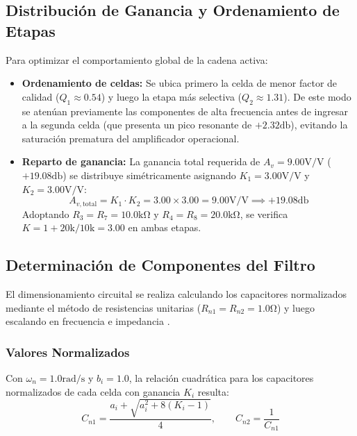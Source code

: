 \subsection{Distribución de Ganancia y Ordenamiento de Etapas}
Para optimizar el comportamiento global de la cadena activa:
\begin{itemize}
    \item \textbf{Ordenamiento de celdas:} Se ubica primero la celda de menor factor de calidad ($Q_1 \approx 0.54$) y
        luego la etapa más selectiva ($Q_2 \approx 1.31$). De este modo se atenúan previamente las componentes de alta
        frecuencia antes de ingresar a la segunda celda (que presenta un pico resonante de $+2.32 \unit{\decibel}$),
        evitando la saturación prematura del amplificador operacional.
    \item \textbf{Reparto de ganancia:} La ganancia total requerida de $A_v = 9.00 \unit{\volt\per\volt}$ ($+19.08
        \unit{\decibel}$) se distribuye simétricamente asignando $K_1 = 3.00 \unit{\volt\per\volt}$ y $K_2 = 3.00
        \unit{\volt\per\volt}$:
        \begin{equation*}
            A_{v,\text{total}} = K_1 \cdot K_2 = 3.00 \times 3.00 = 9.00 \unit{\volt\per\volt} \implies +19.08 \unit{\decibel}
        \end{equation*}
        Adoptando $R_3 = R_7 = 10.0 \unit{\kilo\ohm}$ y $R_4 = R_8 = 20.0 \unit{\kilo\ohm}$, se verifica $K = 1 + 20\text{k}/10\text{k} = 3.00$ en ambas etapas.
\end{itemize}

\subsection{Determinación de Componentes del Filtro}
El dimensionamiento circuital se realiza calculando los capacitores normalizados mediante el método de resistencias
unitarias ($R_{n1} = R_{n2} = 1.0 \unit{\ohm}$) y luego escalando en frecuencia e impedancia \cite{pactitis2001}.

\subsubsection{Valores Normalizados}
Con $\omega_n = 1.0 \unit{\radian\per\second}$ y $b_i = 1.0$, la relación cuadrática para los capacitores normalizados de
cada celda con ganancia $K_i$ resulta:
\begin{equation}
    C_{n1} = \frac{a_i + \sqrt{a_i^2 + 8(K_i - 1)}}{4}, \qquad C_{n2} = \frac{1}{C_{n1}}
\end{equation}

